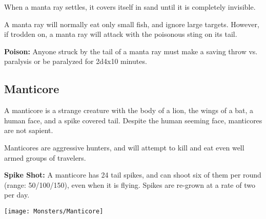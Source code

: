 \begin{multicols*}{2}
When a manta ray settles, it covers itself in sand until it is completely invisible.

A manta ray will normally eat only small fish, and ignore large targets. However, if trodden on, a manta ray will attack with the poisonous sting on its tail.

\textbf{Poison:} Anyone struck by the tail of a manta ray must make a saving throw vs. paralysis or be paralyzed for 2d4x10 minutes.

\subsection{Manticore}

A manticore is a strange creature with the body of a lion, the wings of a bat, a human face, and a spike covered tail. Despite the human seeming face, manticores are not sapient.

Manticores are aggressive hunters, and will attempt to kill and eat even well armed groups of travelers.

\textbf{Spike Shot:} A manticore has 24 tail spikes, and can shoot six of them per round (range: 50/100/150), even when it is flying. Spikes are re-grown at a rate of two per day.

\texttt{[image: Monsters/Manticore]}


\end{multicols*}
